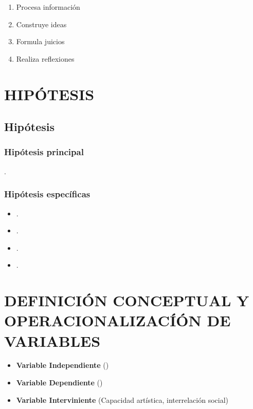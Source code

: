 \documentclass[12pt,a4paper]{article}
\begin{document}
	\begin{enumerate}
\item Procesa información 
\item Construye ideas
\item Formula juicios
\item Realiza reflexiones
	\end{enumerate}
\flushbottom \printglossary[numberedsection,nonumberlist,title=Definiciones  de términos básicos]








\section{HIPÓTESIS}
\subsection{Hipótesis}
\subsubsection{Hipótesis principal}
      \hipotesis.
\subsubsection{Hipótesis específicas}
\begin{itemize}
\item \hipotesise.
\item \hipotesisee.
\item \hipotesiseee.
\item \hipotesiseeee.
\end{itemize}

\section{DEFINICIÓN CONCEPTUAL Y OPERACIONALIZACÍÓN DE VARIABLES }
\begin{itemize}
  \item \textbf{Variable Independiente} (\variablei)
  \item \textbf{Variable Dependiente} (\variabled)
  \item \textbf{Variable Interviniente} (Capacidad artística, interrelación social)
\end{itemize}
\end{document}
